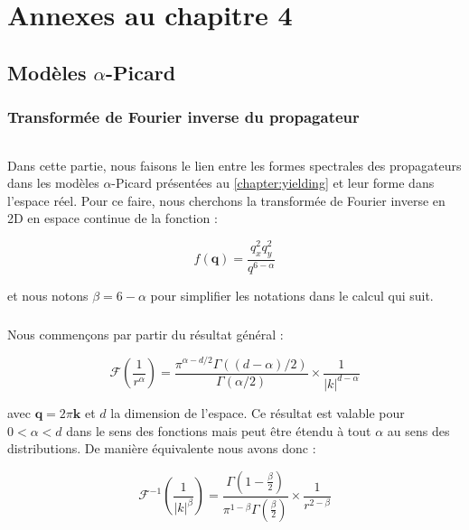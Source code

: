 \FloatBarrier

\chapter{Annexes au chapitre 4}



\section{Modèles $\alpha$-Picard}

\subsection{Transformée de Fourier inverse du propagateur}

\label{sec:TFinverse}

\subparagraph{}Dans cette partie, nous faisons le lien entre les formes spectrales des propagateurs dans les modèles $\alpha$-Picard présentées au \autoref{chapter:yielding} et leur forme dans l'espace réel. Pour ce faire, nous cherchons la transformée de Fourier inverse en 2D en espace continue de la fonction :

\begin{equation}
	f(\mathbf{q}) = \frac{q_x^2 q_y^2}{q^{6-\alpha}}
\end{equation}

\noindent et nous notons $\beta = 6 - \alpha$ pour simplifier les notations dans le calcul qui suit.

\paragraph{}Nous commençons par partir du résultat général :

\begin{equation}
    \mathcal{F}\left( \frac{1}{r^\alpha} \right)=\frac{\pi^{\alpha-d / 2} \Gamma((d-\alpha) / 2)}{\Gamma(\alpha / 2)} \times\frac{1}{|k|^{d-\alpha}}
\end{equation}

\noindent avec $\mathbf{q} = 2\pi \mathbf{k}$ et $d$ la dimension de l'espace. Ce résultat est valable pour $0<\alpha<d$ dans le sens des fonctions mais peut être étendu à tout $\alpha$ au sens des distributions. De manière équivalente nous avons donc :

\begin{equation}
    \mathcal{F}^{-1}\left( \frac{1}{\lvert k \rvert^\beta} \right) = \frac{\Gamma\left( 1-\frac{\beta}{2} \right)}{\pi^{1-\beta}\Gamma\left( \frac{\beta}{2} \right)}\times\frac{1}{r^{2-\beta}}
\end{equation}

